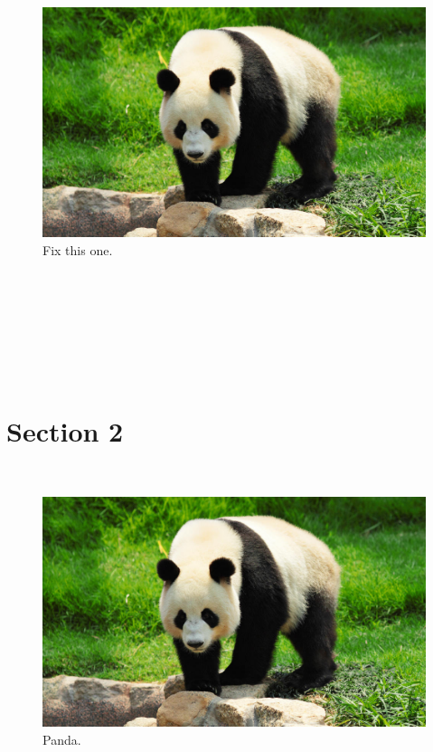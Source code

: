 \documentclass{bioinfo}
\begin{document}
\begin{figure}[ht!]
\includegraphics[scale=0.5]{panda.jpg}
\caption{Fix this one.}
\label{panda2}
\end{figure}

\blindtext\\
\blindtext\\
\blindtext\\
\blindtext\\
\blindtext\\
\blindtext\\
\section{Section 2}
\blindtext\\
\begin{figure}[h!tb]
\centerline{\includegraphics[width=\columnwidth]{panda.jpg}}
\caption{Panda.
\label{panda3}}
\end{figure}
\end{document}
